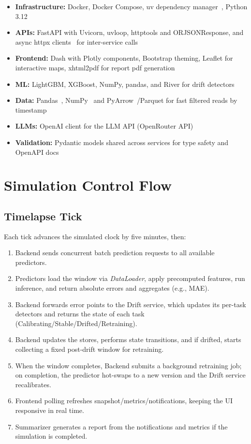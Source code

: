 \begin{itemize}
    \item \textbf{Infrastructure:} Docker, Docker Compose, uv dependency manager~\cite{astral2025uv}, Python 3.12
    \item \textbf{APIs:} FastAPI with Uvicorn, uvloop, httptools and ORJSONResponse, and async httpx clients~\cite{httpx2025} for inter-service calls
    \item \textbf{Frontend:} Dash with Plotly components, Bootstrap theming, Leaflet for interactive maps, xhtml2pdf for report pdf generation
    \item \textbf{ML:} LightGBM, XGBoost, NumPy, pandas, and River for drift detectors
    \item \textbf{Data:} Pandas~\cite{mckinney2010pandas}, NumPy~\cite{harris2020array} and PyArrow~\cite{pyarrow2025}/Parquet for fast filtered reads by timestamp
    \item \textbf{LLMs:} OpenAI client for the LLM API (OpenRouter API)
    \item \textbf{Validation:} Pydantic models shared across services for type safety and OpenAPI docs
\end{itemize}

\section{Simulation Control Flow}
\subsection{Timelapse Tick}
Each tick advances the simulated clock by five minutes, then:

\begin{enumerate}
    \item Backend sends concurrent batch prediction requests to all available predictors.
    \item Predictors load the window via \emph{DataLoader}, apply precomputed features, run inference, and return absolute errors and aggregates (e.g., MAE).
    \item Backend forwards error points to the Drift service, which updates its per-task detectors and returns the state of each task (Calibrating/Stable/Drifted/Retraining).
    \item Backend updates the stores, performs state transitions, and if drifted, starts collecting a fixed post-drift window for retraining.
    \item When the window completes, Backend submits a background retraining job; on completion, the predictor hot-swaps to a new version and the Drift service recalibrates.
    \item Frontend polling refreshes snapshot/metrics/notifications, keeping the UI responsive in real time.
    \item Summarizer generates a report from the notifications and metrics if the simulation is completed.
\end{enumerate}

